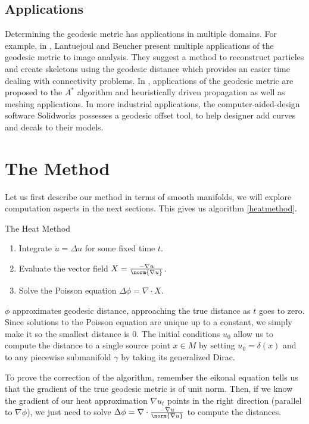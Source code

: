 \documentclass[math, info, english]{cours}
\begin{document}
\subsection{Applications}
Determining the geodesic metric has applications in multiple domains.
For example, in \cite{geodesicmetricuse}, Lantuejoul and Beucher present multiple applications of the geodesic metric to image analysis.
They suggest a method to reconstruct particles and create skeletons using the geodesic distance which provides an easier time dealing with connectivity problems.
In \cite{Peyré2009}, applications of the geodesic metric are proposed to the $A^{*}$ algorithm and heuristically driven propagation as well as meshing applications.
In more industrial applications, the computer-aided-design software Solidworks possesses a geodesic offset tool, to help designer add curves and decals to their models.

\section{The Method}
Let us first describe our method in terms of smooth manifolds, we will explore computation aspects in the next sections.
This gives us algorithm \ref{heatmethod}.
\begin{algorithm}
	\caption{The Heat Method}
	\label{heatmethod}
	\begin{enumerate}
		\item Integrate $\dot{u} = \Delta u$ for some fixed time $t$.
		\item Evaluate the vector field $X = \frac{-\nabla u}{\norm{\nabla u}}$.
		\item Solve the Poisson equation $\Delta \phi = \nabla \cdot X$.
	\end{enumerate}
\end{algorithm}

$\phi$ approximates geodesic distance, approaching the true distance as $t$ goes to zero.
Since solutions to the Poisson equation are unique up to a constant, we simply make it so the smallest distance is $0$.
The initial conditions $u_{0}$ allow us to compute the distance to a single source point $x \in M$ by setting $u_{0} = \delta(x)$ and to any piecewise submanifold $\gamma$ by taking its generalized Dirac.


To prove the correction of the algorithm, remember the eikonal equation tells us that the gradient of the true geodesic metric is of unit norm.
Then, if we know the gradient of our heat approximation $\nabla u_{t}$ points in the right direction (parallel to $\nabla\phi$), we just need to solve $\Delta \phi = \nabla \cdot \frac{-\nabla u}{\norm{\nabla u}}$ to compute the distances.
\end{document}
